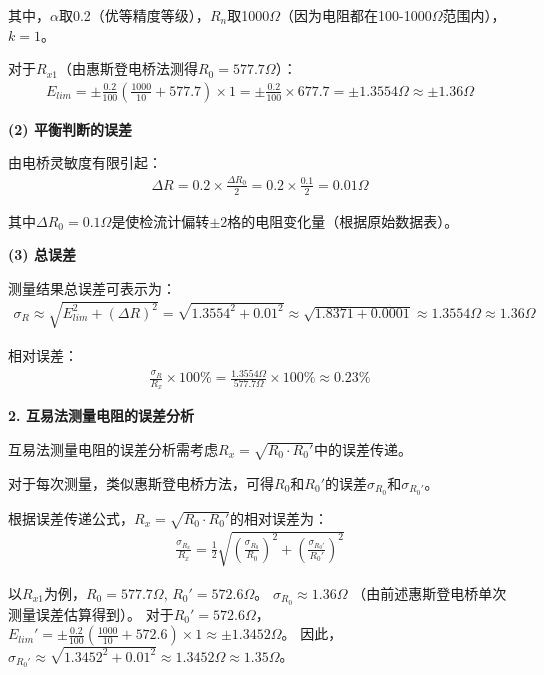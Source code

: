 ﻿\documentclass[12pt,a4paper]{article}
\begin{document}
其中，$\alpha$取0.2（优等精度等级），$R_n$取1000$\Omega$（因为电阻都在100-1000$\Omega$范围内），$k=1$。

对于$R_{x1}$（由惠斯登电桥法测得$R_0 = 577.7\Omega$）：
\begin{align}
    E_{lim} = \pm\frac{0.2}{100}\left(\frac{1000}{10} + 577.7\right) \times 1 = \pm\frac{0.2}{100} \times 677.7 = \pm1.3554\Omega \approx \pm1.36\Omega %
\end{align}

\textbf{(2) 平衡判断的误差}

由电桥灵敏度有限引起：
\begin{align}
    \Delta R = 0.2 \times \frac{\Delta R_0}{2} = 0.2 \times \frac{0.1}{2} = 0.01\Omega
\end{align}

其中$\Delta R_0 = 0.1\Omega$是使检流计偏转$\pm2$格的电阻变化量（根据原始数据表）。

\textbf{(3) 总误差}

测量结果总误差可表示为：
\begin{align}
    \sigma_R \approx \sqrt{E_{lim}^2+(\Delta R)^2} = \sqrt{1.3554^2+0.01^2} \approx \sqrt{1.8371 + 0.0001} \approx 1.3554\Omega \approx 1.36\Omega %
\end{align}

相对误差：
\begin{align}
    \frac{\sigma_R}{R_x} \times 100\% = \frac{1.3554\Omega}{577.7\Omega} \times 100\% \approx 0.23\% %
\end{align}

\textbf{2. 互易法测量电阻的误差分析}

互易法测量电阻的误差分析需考虑$R_x = \sqrt{R_0 \cdot R_0'}$中的误差传递。

对于每次测量，类似惠斯登电桥方法，可得$R_0$和$R_0'$的误差$\sigma_{R_0}$和$\sigma_{R_0'}$。

根据误差传递公式，$R_x = \sqrt{R_0 \cdot R_0'}$的相对误差为：
\begin{align}
    \frac{\sigma_{R_x}}{R_x} = \frac{1}{2}\sqrt{\left(\frac{\sigma_{R_0}}{R_0}\right)^2 + \left(\frac{\sigma_{R_0'}}{R_0'}\right)^2}
\end{align}

以$R_{x1}$为例，$R_0 = 577.7\Omega$, $R_0' = 572.6\Omega$。
$\sigma_{R_0} \approx 1.36\Omega$ （由前述惠斯登电桥单次测量误差估算得到）。
对于$R_0' = 572.6\Omega$，$E_{lim}' = \pm\frac{0.2}{100}(\frac{1000}{10} + 572.6) \times 1 \approx \pm1.3452\Omega$。
因此，$\sigma_{R_0'} \approx \sqrt{1.3452^2 + 0.01^2} \approx 1.3452\Omega \approx 1.35\Omega$。
\end{document}
